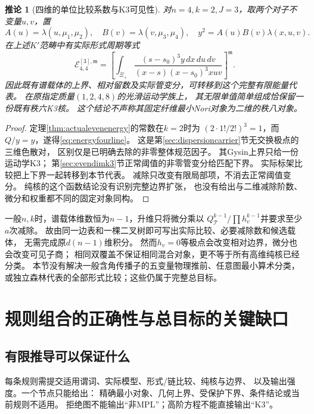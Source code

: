 \documentclass[11pt,a4paper]{ctexart}
\theoremstyle{cnplain}\newtheorem{theorem}{定理}[section]
\newtheorem{corollary}[theorem]{推论}
\theoremstyle{definition}\newtheorem{definition}[theorem]{定义}
\theoremstyle{remark}\newtheorem{remark}[theorem]{注}
\begin{document}
\begin{corollary}[四维的单位比较系数与K3可见性]\label{cor:energyfourline}
对$n=4,k=2,J=3$，取两个对子不变量$u,v$，置
\[
 A(u)=\lambda(u,\mu_1,\mu_2),\quad
 B(v)=\lambda(v,\mu_3,\mu_4),\quad
 y^2=A(u)B(v)\lambda(x,u,v).
\]
在上述$K'$范畴中有实际形式周期等式
\begin{equation}\label{eq:energyfourline}
 \mathcal E_{4,4}^{[3],\mathfrak m}
 =\left[\int_{\Xi_+}
   \frac{(s-s_0)^3 y\,dx\,du\,dv}
        {(x-s)(x-s_0)^3xuv}\right]^{\mathfrak m}.
\end{equation}
因此既有谱载体的上界、相对留数及实际管变分，可转移到这个完整有限能量代表。
在原指定质量$(1,2,4,8)$的光滑运动学族上，
其无限单值简单组成恰保留一份既有秩六K3核。
这个结论不声称其固定纤维最小Nori对象为二维的秩八对象。
\end{corollary}
\begin{proof}
定理\ref{thm:actualevenenergy}的常数在$k=2$时为
$(2\cdot1!/2!)^3=1$，而$Q/y=y$，遂得\eqref{eq:energyfourline}。
这是第\ref{sec:dispersioncarrier}节无交换极点的三维色散对，
区别仅是已明确去除的非零整体规范因子。
其Gysin上界只给一份运动学K3；
第\ref{sec:evendimk3}节正常阈值的非零管变分给匹配下界。
实际标架比较把上下界一起转移到本节代表。
减除只改变有限局部项，不消去正常阈值变分。
纯核的这个函数结论没有识别完整边界扩张，
也没有给出与二维减除阶数、微分和权重都不同的固定对象同构。
\end{proof}

一般$n,k$时，谱载体维数恒为$n-1$，升维只将微分乘以
$Q_{\mathcal T}^{k-1}/\prod h_v^{k-1}$并要求至少$a$次减除。
故由同一边表和一棵二叉树即可写出实际比较、必要减除数和候选载体，
无需完成原$d(n-1)$维积分。
然而$h_v=0$等极点会改变相对边界，微分也会改变可见子商；
相同双覆盖不保证相同混合对象，更不等于所有高维纯核已经分类。
本节没有解决一般含角传播子的五变量物理推前、任意图最小算术分类，
或独立森林代表的全部形式比较；这些仍属于完整总目标。



\section{规则组合的正确性与总目标的关键缺口}
\subsection{有限推导可以保证什么}
每条规则需提交适用谓词、实际模型、形式/链比较、纯核与边界、
以及输出强度。一个节点只能给出：
精确最小对象、几何上界、受保护下界、条件结论或当前规则不适用。
拒绝图不能输出“非MPL”；高阶方程不能直接输出“K3”。
\end{document}
